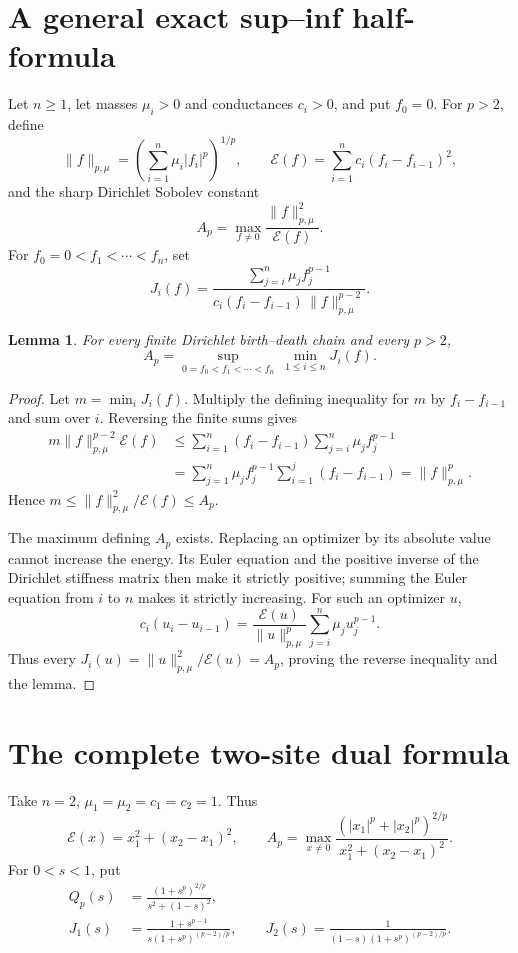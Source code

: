 \documentclass[11pt]{article}
\newtheorem{lemma}{Lemma}
\newcommand{\E}{\mathcal E}
\begin{document}
\section{A general exact sup--inf half-formula}
Let $n\ge1$, let masses $\mu_i>0$ and conductances $c_i>0$, and put $f_0=0$.
For $p>2$, define
\[
 \|f\|_{p,\mu}=\left(\sum_{i=1}^n\mu_i|f_i|^p\right)^{1/p},\qquad
 \E(f)=\sum_{i=1}^n c_i(f_i-f_{i-1})^2,
\]
and the sharp Dirichlet Sobolev constant
\[
 A_p=\max_{f\ne0}\frac{\|f\|_{p,\mu}^2}{\E(f)}.
\]
For $f_0=0<f_1<\cdots<f_n$, set
\begin{equation}\label{eq:Jgeneral}
 J_i(f)=
 \frac{\sum_{j=i}^n\mu_j f_j^{p-1}}
 {c_i(f_i-f_{i-1})\,\|f\|_{p,\mu}^{p-2}}.
\end{equation}

\begin{lemma}\label{lem:half}
For every finite Dirichlet birth--death chain and every $p>2$,
\[
 A_p=\sup_{0=f_0<f_1<\cdots<f_n}\ \min_{1\le i\le n}J_i(f).
\]
\end{lemma}

\begin{proof}
Let $m=\min_iJ_i(f)$.  Multiply the defining inequality for $m$ by
$f_i-f_{i-1}$ and sum over $i$.  Reversing the finite sums gives
\begin{align*}
 m\|f\|_{p,\mu}^{p-2}\E(f)
 &\le \sum_{i=1}^n(f_i-f_{i-1})
       \sum_{j=i}^n\mu_j f_j^{p-1}\\
 &=\sum_{j=1}^n\mu_jf_j^{p-1}
       \sum_{i=1}^j(f_i-f_{i-1})
 =\|f\|_{p,\mu}^{p}.
\end{align*}
Hence $m\le\|f\|_{p,\mu}^2/\E(f)\le A_p$.

The maximum defining $A_p$ exists.  Replacing an optimizer by its absolute
value cannot increase the energy.  Its Euler equation and the positive
inverse of the Dirichlet stiffness matrix then make it strictly positive;
summing the Euler equation from $i$ to $n$ makes it strictly increasing.
For such an optimizer $u$,
\[
 c_i(u_i-u_{i-1})
 =\frac{\E(u)}{\|u\|_{p,\mu}^p}
   \sum_{j=i}^n\mu_j u_j^{p-1}.
\]
Thus every $J_i(u)=\|u\|_{p,\mu}^2/\E(u)=A_p$, proving the reverse
inequality and the lemma.
\end{proof}

\section{The complete two-site dual formula}
Take $n=2$, $\mu_1=\mu_2=c_1=c_2=1$.  Thus
\[
 \E(x)=x_1^2+(x_2-x_1)^2,\qquad
 A_p=\max_{x\ne0}\frac{(|x_1|^p+|x_2|^p)^{2/p}}
 {x_1^2+(x_2-x_1)^2}.
\]
For $0<s<1$, put
\begin{align}
 Q_p(s)&=\frac{(1+s^p)^{2/p}}{s^2+(1-s)^2},\label{eq:Q}\\
 J_1(s)&=\frac{1+s^{p-1}}{s(1+s^p)^{(p-2)/p}},\qquad
 J_2(s)=\frac{1}{(1-s)(1+s^p)^{(p-2)/p}}.\label{eq:Jtwo}
\end{align}
\end{document}
